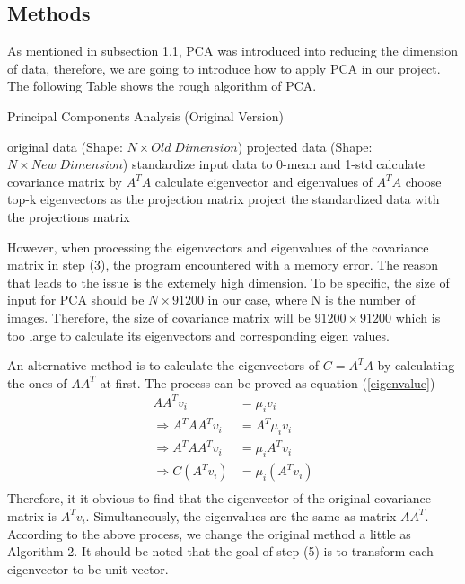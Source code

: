 \documentclass{article}
\begin{document}
\subsection{Methods}
As mentioned in subsection 1.1, PCA was introduced into reducing the dimension of data, therefore, we are going to introduce how to apply PCA in our project. The following Table shows the rough algorithm of PCA.
\begin{algorithm}
        \caption{Principal Components Analysis (Original Version)}
        \begin{algorithmic}[1]
            \Require original data (Shape: $N\times Old \;Dimension$)
            \Ensure  projected data (Shape: $N\times New \;Dimension$)
             \State standardize input data to 0-mean and 1-std
             \State calculate covariance matrix by $A^TA$
             \State calculate eigenvector and eigenvalues of $A^TA$
             \State choose top-k eigenvectors as the projection matrix
             \State project the standardized data with the projections matrix
        \end{algorithmic}
\end{algorithm}
\par
However, when processing the eigenvectors and eigenvalues of the covariance matrix in step (3), the program encountered with a memory error. The reason that leads to the issue is the extemely high dimension. To be specific, the size of input for PCA should be $N\times 91200$ in our case, where N is the number of images. Therefore, the size of covariance matrix will be $91200\times 91200$ which is too large to calculate its eigenvectors and corresponding eigen values.
\par
An alternative method is to calculate the eigenvectors of $C = A^TA$ by calculating the ones of $AA^T$ at first. The process can be proved as equation (\ref{eigenvalue})
\begin{equation}
    \begin{split}
    AA^Tv_i &= \mu_iv_i\\
    \Rightarrow A^TAA^Tv_i &= A^T\mu_iv_i\\
    \Rightarrow A^TAA^Tv_i &= \mu_iA^Tv_i\\
    \Rightarrow C(A^Tv_i)  &= \mu_i(A^Tv_i)\\
    \label{eigenvalue}
    \end{split}
\end{equation}
Therefore, it it obvious to find that the eigenvector of the original covariance matrix is $A^Tv_i$. Simultaneously, the eigenvalues are the same as matrix $AA^T$. According to the above process, we change the original method a little as Algorithm 2. It should be noted that the goal of step (5) is to transform each eigenvector to be unit vector.
\end{document}
